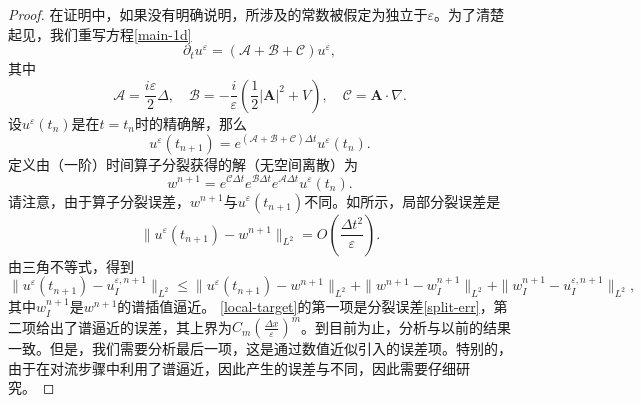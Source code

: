 \begin{proof}	
	在证明中，如果没有明确说明，所涉及的常数被假定为独立于$\varepsilon$。为了清楚起见，我们重写方程\eqref{main-1d}
	\begin{equation}
	\partial_t u^\varepsilon=(\mathcal{A}+\mathcal{B}+\mathcal{C})u^\varepsilon,
	\end{equation}
	其中
	$$
	\mathcal{A}=\frac{i\varepsilon}{2}\Delta,\quad \mathcal{B}=-\frac{i}{\varepsilon}\left(\frac{1}{2}|\mathbf{A}|^2+V\right),\quad \mathcal{C}=\mathbf{A}\cdot\nabla.
	$$
	设$u^\varepsilon(t_n)$是在$t=t_n$时的精确解，那么 
	\begin{equation}
	u^\varepsilon(t_{n+1})=e^{(\mathcal{A}+\mathcal{B}+\mathcal{C})\Delta t}u^\varepsilon(t_n).
	\end{equation}
	定义由（一阶）时间算子分裂获得的解（无空间离散）为
	\begin{equation}
	w^{n+1}=e^{\mathcal{C}\Delta t}e^{\mathcal{B}\Delta t}e^{\mathcal{A}\Delta t}u^\varepsilon(t_n).
	\end{equation}
	请注意，由于算子分裂误差，$w^{n+1}$与$u^\varepsilon(t_{n+1})$不同。如所示，局部分裂误差是
	\begin{equation}\label{split-err}
	\|u^\varepsilon(t_{n+1})-w^{n+1}\|_{L^2}=O\left(\frac{\Delta t^2}{\varepsilon}\right).
	\end{equation}
	由三角不等式，得到
	\begin{equation}\label{local-target}
	\|u^\varepsilon(t_{n+1})-u^{\varepsilon,n+1}_I\|_{L^2}\leq \|u^\varepsilon(t_{n+1})-w^{n+1}\|_{L^2}+\|w^{n+1}-w^{n+1}_I\|_{L^2}+\|w^{n+1}_I-u^{\varepsilon,n+1}_I\|_{L^2},
	\end{equation}
	其中$w^{n+1}_I$是$w^{n+1}$的谱插值逼近。 
  \eqref{local-target}的第一项是分裂误差\eqref{split-err}，第二项给出了谱逼近的误差，其上界为$C_m(\frac{\Delta x}{\varepsilon})^m$。到目前为止，分析与以前的结果一致。但是，我们需要分析最后一项，这是通过数值近似引入的误差项。特别的，由于在对流步骤中利用了谱逼近，因此产生的误差与不同，因此需要仔细研究。


\end{proof}
